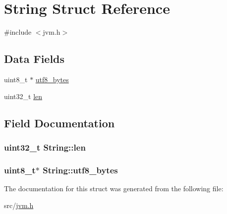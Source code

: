 \hypertarget{structString}{}\section{String Struct Reference}
\label{structString}


{\ttfamily \#include $<$jvm.\+h$>$}

\subsection*{Data Fields}
\begin{DoxyCompactItemize}
\item 
uint8\+\_\+t $\ast$ \hyperlink{structString_a9961c14ba61c6ab4b4453fd7002a09e6}{utf8\+\_\+bytes}
\item 
uint32\+\_\+t \hyperlink{structString_a83d3a7e0af08128f210cdedaecb085a2}{len}
\end{DoxyCompactItemize}


\subsection{Field Documentation}
\subsubsection[{\texorpdfstring{len}{len}}]{\setlength{\rightskip}{0pt plus 5cm}uint32\+\_\+t String\+::len}\hypertarget{structString_a83d3a7e0af08128f210cdedaecb085a2}{}\label{structString_a83d3a7e0af08128f210cdedaecb085a2}
\subsubsection[{\texorpdfstring{utf8\+\_\+bytes}{utf8_bytes}}]{\setlength{\rightskip}{0pt plus 5cm}uint8\+\_\+t$\ast$ String\+::utf8\+\_\+bytes}\hypertarget{structString_a9961c14ba61c6ab4b4453fd7002a09e6}{}\label{structString_a9961c14ba61c6ab4b4453fd7002a09e6}


The documentation for this struct was generated from the following file\+:\begin{DoxyCompactItemize}
\item 
src/\hyperlink{jvm_8h}{jvm.\+h}\end{DoxyCompactItemize}
